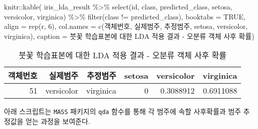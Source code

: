 \documentclass[
]{book}
\newenvironment{Shaded}{\begin{snugshade}}{\end{snugshade}}
\newcommand{\AttributeTok}[1]{\textcolor[rgb]{0.77,0.63,0.00}{#1}}
\newcommand{\ConstantTok}[1]{\textcolor[rgb]{0.00,0.00,0.00}{#1}}
\newcommand{\DecValTok}[1]{\textcolor[rgb]{0.00,0.00,0.81}{#1}}
\newcommand{\FunctionTok}[1]{\textcolor[rgb]{0.00,0.00,0.00}{#1}}
\newcommand{\NormalTok}[1]{#1}
\newcommand{\SpecialCharTok}[1]{\textcolor[rgb]{0.00,0.00,0.00}{#1}}
\newcommand{\StringTok}[1]{\textcolor[rgb]{0.31,0.60,0.02}{#1}}
\begin{document}
\begin{Shaded}
\begin{Highlighting}[]
\NormalTok{knitr}\SpecialCharTok{::}\FunctionTok{kable}\NormalTok{(}
\NormalTok{  iris\_lda\_result }\SpecialCharTok{\%\textgreater{}\%} 
    \FunctionTok{select}\NormalTok{(id, class, predicted\_class,}
\NormalTok{           setosa, versicolor, virginica) }\SpecialCharTok{\%\textgreater{}\%} 
    \FunctionTok{filter}\NormalTok{(class }\SpecialCharTok{!=}\NormalTok{ predicted\_class),}
  \AttributeTok{booktabs =} \ConstantTok{TRUE}\NormalTok{,}
  \AttributeTok{align =} \FunctionTok{rep}\NormalTok{(}\StringTok{\textquotesingle{}r\textquotesingle{}}\NormalTok{, }\DecValTok{6}\NormalTok{),}
  \AttributeTok{col.names =} \FunctionTok{c}\NormalTok{(}\StringTok{\textquotesingle{}객체번호\textquotesingle{}}\NormalTok{, }\StringTok{\textquotesingle{}실제범주\textquotesingle{}}\NormalTok{, }\StringTok{\textquotesingle{}추정범주\textquotesingle{}}\NormalTok{,}
                \StringTok{\textquotesingle{}setosa\textquotesingle{}}\NormalTok{, }\StringTok{\textquotesingle{}versicolor\textquotesingle{}}\NormalTok{, }\StringTok{\textquotesingle{}virginica\textquotesingle{}}\NormalTok{),}
  \AttributeTok{caption =} \StringTok{\textquotesingle{}붓꽃 학습표본에 대한 LDA 적용 결과 {-} 오분류 객체 사후 확률\textquotesingle{}}\NormalTok{)}
\end{Highlighting}
\end{Shaded}

\begin{table}

\caption{\label{tab:iris-lda}붓꽃 학습표본에 대한 LDA 적용 결과 - 오분류 객체 사후 확률}
\centering
\begin{tabular}[t]{rrrrrr}
\toprule
객체번호 & 실제범주 & 추정범주 & setosa & versicolor & virginica\\
\midrule
51 & versicolor & virginica & 0 & 0.3088912 & 0.6911088\\
\bottomrule
\end{tabular}
\end{table}

아래 스크립트는 \texttt{MASS} 패키지의 \texttt{qda} 함수를 통해 각 범주에 속할 사후확률과 범주 추정값을 얻는 과정을 보여준다.
\end{document}
